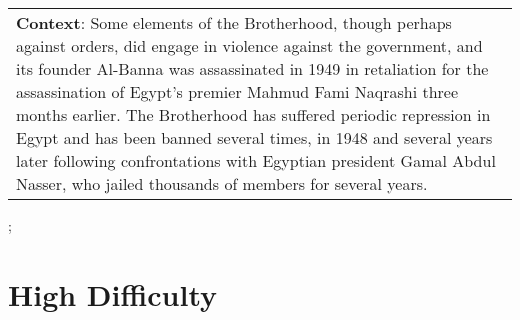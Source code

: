 \begin{figure*}[ht]
{\begin{tabular}{p{}}
            \textbf{Context}: Some elements of the Brotherhood, though perhaps against orders, did engage in violence against the government, and its founder Al-Banna was assassinated in 1949 in retaliation for the assassination of Egypt's premier Mahmud Fami Naqrashi three months earlier. The Brotherhood has suffered periodic repression in Egypt and has been banned several times, in 1948 and several years later following confrontations with Egyptian president Gamal Abdul Nasser, who jailed thousands of members for several years. \\
        \end{tabular}
    };
    \label{fig:ex-5acfea0677cf76001a686466}
\end{figure*}

\clearpage

\section{High Difficulty}


